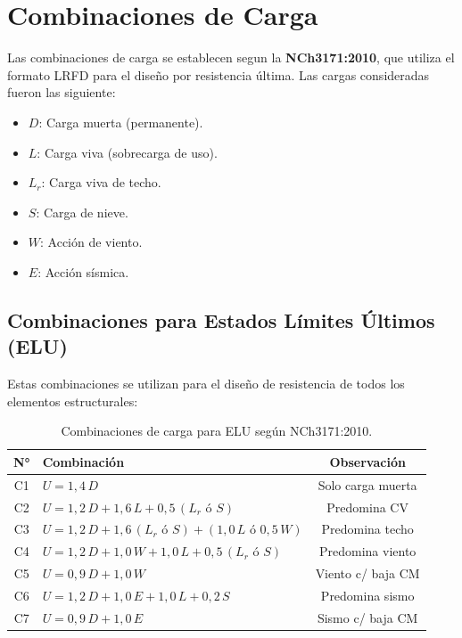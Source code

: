\section{Combinaciones de Carga}
Las combinaciones de carga se establecen segun la \textbf{NCh3171:2010}, que utiliza el formato LRFD para el diseño por resistencia última. Las cargas consideradas fueron las siguiente:

\begin{itemize}
    \item $D$: Carga muerta (permanente).
    \item $L$: Carga viva (sobrecarga de uso).
    \item $L_r$: Carga viva de techo.
    \item $S$: Carga de nieve.
    \item $W$: Acción de viento.
    \item $E$: Acción sísmica.
\end{itemize}

\subsection{Combinaciones para Estados Límites Últimos (ELU)}

Estas combinaciones se utilizan para el diseño de resistencia de todos los elementos estructurales:

\begin{table}[H]
    \centering
    \caption{Combinaciones de carga para ELU según NCh3171:2010.}
    \label{tab:combinaciones_elu}
    \begin{tabular}{clc}
        \hline
        \textbf{N°} & \textbf{Combinación} & \textbf{Observación} \\
        \hline
        C1 & $U = 1{,}4\,D$ & Solo carga muerta \\
        C2 & $U = 1{,}2\,D + 1{,}6\,L + 0{,}5\,(L_r \text{ ó } S)$ & Predomina CV \\
        C3 & $U = 1{,}2\,D + 1{,}6\,(L_r \text{ ó } S) + (1{,}0\,L \text{ ó } 0{,}5\,W)$ & Predomina techo \\
        C4 & $U = 1{,}2\,D + 1{,}0\,W + 1{,}0\,L + 0{,}5\,(L_r \text{ ó } S)$ & Predomina viento \\
        C5 & $U = 0{,}9\,D + 1{,}0\,W$ & Viento c/ baja CM \\
        C6 & $U = 1{,}2\,D + 1{,}0\,E + 1{,}0\,L + 0{,}2\,S$ & Predomina sismo \\
        C7 & $U = 0{,}9\,D + 1{,}0\,E$ & Sismo c/ baja CM \\
        \hline
    \end{tabular}
\end{table}

